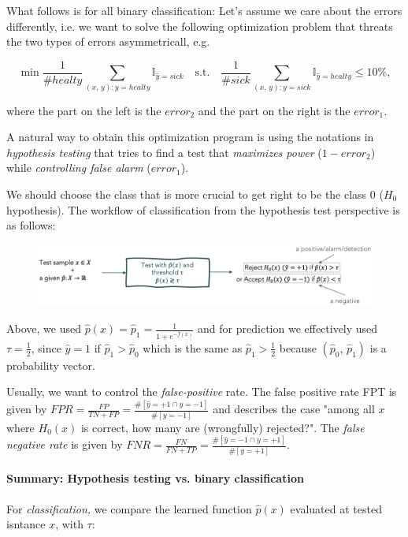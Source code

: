 \documentclass[a4paper]{extarticle}
\begin{document}
What follows is for all binary classification: Let's assume we care about the errors differently, i.e. we want to solve the following optimization problem that threats the two types of errors asymmetricall, e.g.

\[
    \min \frac{1}{\# healty} \sum_{(x, \, y) : y = healty} \mathbb{I}_{\hat{y} = sick} \quad \text{s.t.} \quad \frac{1}{\# sick} \sum_{(x, \, y) : y = sick} \mathbb{I}_{\hat{y} = healty} \leq 10 \%,
\]

where the part on the left is the \(error_2\) and the part on the right is the \(error_1\).

A natural way to obtain this optimization program is using the notations in \textit{hypothesis testing} that tries to find a test that \textit{maximizes power} (\(1 - error_2\)) while \textit{controlling false alarm} (\(error_1\)).

We should choose the class that is more crucial to get right to be the class 0 (\(H_0\) hypothesis). The workflow of classification from the hypothesis test perspective is as follows:

\begin{figure}[H]
    \includegraphics[width=15cm]{../images/IntroML_Fig4-13}
    \centering
\end{figure}

Above, we used \(\hat{p}(x) = \hat{p}_1 = \frac{1}{1 + e^{- \hat{f}(x)}}\) and for prediction we effectively used \(\tau = \frac{1}{2}\), since \(\hat{y} = 1\) if \(\hat{p}_1 > \hat{p}_0\) which is the same as \(\hat{p}_1 > \frac{1}{2}\) because \((\hat{p}_0, \, \hat{p}_1)\) is a probability vector.

Usually, we want to control the \textit{false-positive} rate. The false positive rate FPT is given by \(FPR = \frac{FP}{TN + FP} = \frac{\#[\hat{y} = + 1 \cap y = -1]}{\#[y = -1]}\) and describes the case "among all \(x\) where \(H_0(x)\) is correct, how many are (wrongfully) rejected?". The \textit{false negative rate} is given by \(FNR = \frac{FN}{FN + TP} = \frac{\#[\hat{y} = -1 \cap y = + 1]}{\#[y = + 1]}\).

\paragraph{Summary: Hypothesis testing vs. binary classification} For \textit{classification,} we compare the learned function \(\hat{p}(x)\) evaluated at tested isntance \(x\), with \(\tau\):
\end{document}

